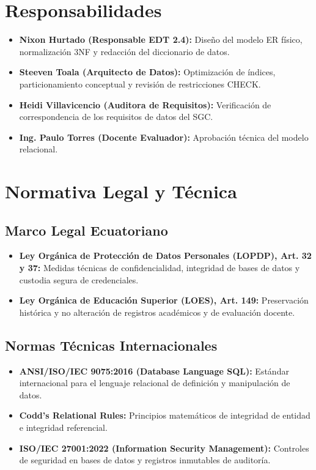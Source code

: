 \documentclass[12pt,a4paper]{article}
\begin{document}
\section{Responsabilidades}
\begin{itemize}[leftmargin=1.5em, itemsep=2pt]
    \item \textbf{Nixon Hurtado (Responsable EDT 2.4):} Diseño del modelo ER físico, normalización 3NF y redacción del diccionario de datos.
    \item \textbf{Steeven Toala (Arquitecto de Datos):} Optimización de índices, particionamiento conceptual y revisión de restricciones CHECK.
    \item \textbf{Heidi Villavicencio (Auditora de Requisitos):} Verificación de correspondencia de los requisitos de datos del SGC.
    \item \textbf{Ing. Paulo Torres (Docente Evaluador):} Aprobación técnica del modelo relacional.
\end{itemize}

\section{Normativa Legal y Técnica}
\subsection{Marco Legal Ecuatoriano}
\begin{itemize}[leftmargin=1.5em, itemsep=2pt]
    \item \textbf{Ley Orgánica de Protección de Datos Personales (LOPDP), Art. 32 y 37:} Medidas técnicas de confidencialidad, integridad de bases de datos y custodia segura de credenciales.
    \item \textbf{Ley Orgánica de Educación Superior (LOES), Art. 149:} Preservación histórica y no alteración de registros académicos y de evaluación docente.
\end{itemize}
\subsection{Normas Técnicas Internacionales}
\begin{itemize}[leftmargin=1.5em, itemsep=2pt]
    \item \textbf{ANSI/ISO/IEC 9075:2016 (Database Language SQL):} Estándar internacional para el lenguaje relacional de definición y manipulación de datos.
    \item \textbf{Codd's Relational Rules:} Principios matemáticos de integridad de entidad e integridad referencial.
    \item \textbf{ISO/IEC 27001:2022 (Information Security Management):} Controles de seguridad en bases de datos y registros inmutables de auditoría.
\end{itemize}
\end{document}
